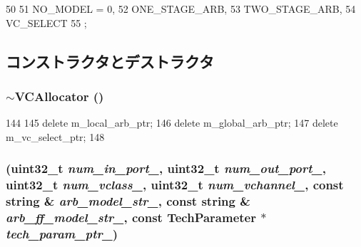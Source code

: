 \begin{DoxyCode}
50     {
51       NO_MODEL = 0,
52       ONE_STAGE_ARB,
53       TWO_STAGE_ARB,
54       VC_SELECT
55     };
\end{DoxyCode}


\subsection{コンストラクタとデストラクタ}
\hypertarget{classVCAllocator_a3c65801087ea345f2733a3742c59db1b}{
\subsubsection[{$\sim$VCAllocator}]{\setlength{\rightskip}{0pt plus 5cm}$\sim${\bf VCAllocator} ()}}
\label{classVCAllocator_a3c65801087ea345f2733a3742c59db1b}



\begin{DoxyCode}
144 {
145     delete m_local_arb_ptr;
146     delete m_global_arb_ptr;
147     delete m_vc_select_ptr;
148 }
\end{DoxyCode}
\hypertarget{classVCAllocator_aecc1c32dc5dcfb2f4cb618d6f3a56c16}{
\subsubsection[{VCAllocator}]{ ({\bf uint32\_\-t} {\em num\_\-in\_\-port\_\-}, \/  {\bf uint32\_\-t} {\em num\_\-out\_\-port\_\-}, \/  {\bf uint32\_\-t} {\em num\_\-vclass\_\-}, \/  {\bf uint32\_\-t} {\em num\_\-vchannel\_\-}, \/  const string \& {\em arb\_\-model\_\-str\_\-}, \/  const string \& {\em arb\_\-ff\_\-model\_\-str\_\-}, \/  const {\bf TechParameter} $\ast$ {\em tech\_\-param\_\-ptr\_\-})}}
\label{classVCAllocator_aecc1c32dc5dcfb2f4cb618d6f3a56c16}



